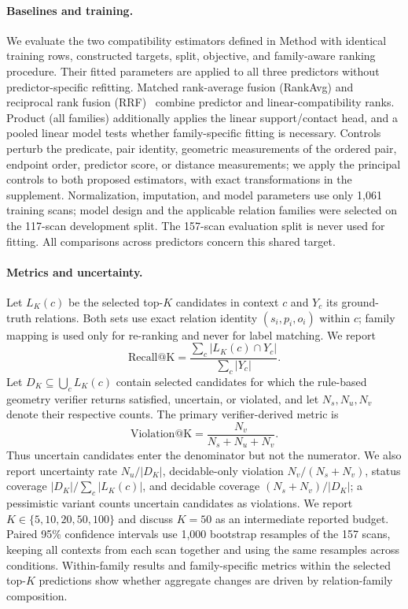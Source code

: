 \paragraph{Baselines and training.}
We evaluate the two compatibility estimators defined in Method with identical
training rows, constructed targets, split, objective, and family-aware ranking
procedure. Their fitted parameters are applied to all three predictors without
predictor-specific refitting. Matched rank-average fusion (RankAvg) and reciprocal rank fusion
(RRF)~\cite{cormack2009rrf} combine predictor and linear-compatibility ranks.
Product (all families) additionally applies the linear support/contact head,
and a pooled linear model tests whether family-specific fitting is necessary.
Controls perturb the predicate, pair identity,
geometric measurements of the ordered pair, endpoint order, predictor score, or distance
measurements; we apply the principal controls to both proposed estimators, with
exact transformations in the supplement. Normalization, imputation, and model
parameters use only 1,061
training scans; model design and the applicable relation families were selected
on the 117-scan development split.
The 157-scan evaluation split is never used for fitting. All comparisons across
predictors concern this shared target.

\paragraph{Metrics and uncertainty.}
Let $L_K(c)$ be the selected top-$K$ candidates in context $c$ and $Y_c$ its
ground-truth relations. Both sets use exact relation identity
$(s_i,p_i,o_i)$ within $c$; family mapping is used only for re-ranking and never
for label matching. We report
\begin{equation}
\mathrm{Recall@K}=\frac{\sum_c |L_K(c)\cap Y_c|}{\sum_c |Y_c|}.
\end{equation}
Let $D_K\subseteq\bigcup_c L_K(c)$ contain selected candidates for which the
rule-based geometry verifier returns satisfied, uncertain, or violated, and
let $N_s,N_u,N_v$ denote their respective counts. The primary verifier-derived
metric is
\begin{equation}
\mathrm{Violation@K}=\frac{N_v}{N_s+N_u+N_v}.
\end{equation}
Thus uncertain candidates enter the denominator but not the numerator. We also
report uncertainty rate $N_u/|D_K|$, decidable-only violation
$N_v/(N_s+N_v)$, status coverage
$|D_K|/\sum_c|L_K(c)|$, and decidable coverage $(N_s+N_v)/|D_K|$; a
pessimistic variant counts uncertain candidates as violations. We report
$K\in\{5,10,20,50,100\}$ and discuss
$K=50$ as an intermediate reported budget. Paired 95\% confidence intervals
use 1,000 bootstrap resamples of the 157 scans, keeping all contexts from each
scan together and using the same resamples across conditions. Within-family results and family-specific
metrics within the selected top-$K$ predictions show whether aggregate changes
are driven by relation-family composition.

